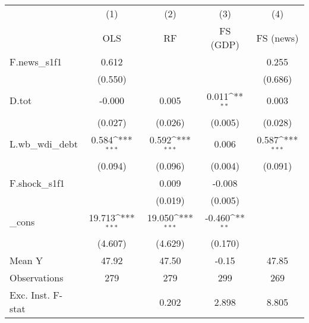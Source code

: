 {
\def\sym#1{\ifmmode^{#1}\else\(^{#1}\)\fi}
\begin{tabular}{l*{4}{c}}
\toprule
            &\multicolumn{1}{c}{(1)}&\multicolumn{1}{c}{(2)}&\multicolumn{1}{c}{(3)}&\multicolumn{1}{c}{(4)}\\
            &\multicolumn{1}{c}{OLS}&\multicolumn{1}{c}{RF}&\multicolumn{1}{c}{FS (GDP)}&\multicolumn{1}{c}{FS (news)}\\
\midrule
F.news\_s1f1 &       0.612         &                     &                     &       0.255         \\
            &     (0.550)         &                     &                     &     (0.686)         \\
\addlinespace
D.tot       &      -0.000         &       0.005         &       0.011\sym{**} &       0.003         \\
            &     (0.027)         &     (0.026)         &     (0.005)         &     (0.028)         \\
\addlinespace
L.wb\_wdi\_debt&       0.584\sym{***}&       0.592\sym{***}&       0.006         &       0.587\sym{***}\\
            &     (0.094)         &     (0.096)         &     (0.004)         &     (0.091)         \\
\addlinespace
F.shock\_s1f1&                     &       0.009         &      -0.008         &                     \\
            &                     &     (0.019)         &     (0.005)         &                     \\
\addlinespace
\_cons      &      19.713\sym{***}&      19.050\sym{***}&      -0.460\sym{**} &                     \\
            &     (4.607)         &     (4.629)         &     (0.170)         &                     \\
\midrule
Mean Y      &       47.92         &       47.50         &       -0.15         &       47.85         \\
Observations&         279         &         279         &         299         &         269         \\
Exc. Inst. F-stat&                     &       0.202         &       2.898         &       8.805         \\
\bottomrule
\end{tabular}
}
